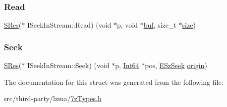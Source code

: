 \subsubsection{\texorpdfstring{Read}{Read}}
{\footnotesize\ttfamily \mbox{\hyperlink{7z_types_8h_acc0053eeb62726b68b22e8c7d9e91367}{S\+Res}}($\ast$ I\+Seek\+In\+Stream\+::\+Read) (void $\ast$p, void $\ast$\mbox{\hyperlink{ioapi_8h_a8ad8a13c88886b9f623034ff88570adb}{buf}}, size\+\_\+t $\ast$\mbox{\hyperlink{ioapi_8h_a014d89bd76f74ef3a29c8f04b473eb76}{size}})}

\mbox{\label{struct_i_seek_in_stream_a7fdebfa496b02cbc30ff2e966d94cefe}} 
\subsubsection{\texorpdfstring{Seek}{Seek}}
{\footnotesize\ttfamily \mbox{\hyperlink{7z_types_8h_acc0053eeb62726b68b22e8c7d9e91367}{S\+Res}}($\ast$ I\+Seek\+In\+Stream\+::\+Seek) (void $\ast$p, \mbox{\hyperlink{7z_types_8h_ade5ca5eec203b16d15253b7c422808bf}{Int64}} $\ast$pos, \mbox{\hyperlink{7z_types_8h_ab0216441b8737c13f5b275408f9e9709}{E\+Sz\+Seek}} \mbox{\hyperlink{ioapi_8h_a5f189a59b66f135978bce54f9d0fcade}{origin}})}



The documentation for this struct was generated from the following file\+:\begin{DoxyCompactItemize}
\item 
src/third-\/party/lzma/\mbox{\hyperlink{7z_types_8h}{7z\+Types.\+h}}\end{DoxyCompactItemize}
